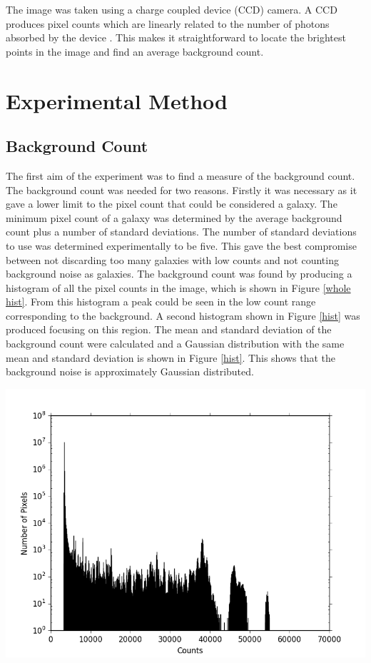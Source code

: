 \documentclass[10pt,a4paper]{article}
\begin{document}
The image was taken using a charge coupled device (CCD) camera. A CCD produces pixel counts which are linearly related to the number of photons absorbed by the device \cite{lab_script}. This makes it straightforward to locate the brightest points in the image and find an average background count.

\section*{Experimental Method}
\subsection*{Background Count}
The first aim of the experiment was to find a measure of the background count. The background count was needed for two reasons. Firstly it was necessary as it gave a lower limit to the pixel count that could be considered a galaxy. The minimum pixel count of a galaxy was determined by the average background count plus a number of standard deviations. The number of standard deviations to use was determined experimentally to be five. This gave the best compromise between not discarding too many galaxies with low counts and not counting background noise as galaxies. The background count was found by producing a histogram of all the pixel counts in the image, which is shown in Figure \ref{whole hist}. From this histogram a peak could be seen in the low count range corresponding to the background. A second histogram shown in Figure \ref{hist} was produced focusing on this region. The mean and standard deviation of the background count were calculated and a Gaussian distribution with the same mean and standard deviation is shown in Figure \ref{hist}. This shows that the background noise is approximately Gaussian distributed.

\begin{center}
\includegraphics [width=10 cm]{whole_hist.png}
\label{whole hist}
\end{center}
\end{document}
